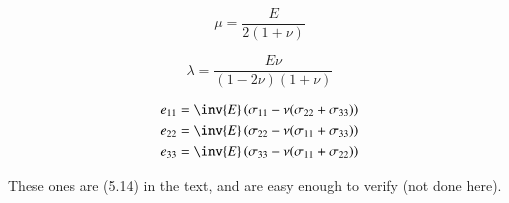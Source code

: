\begin{equation}\label{eqn:continuumL5:430}
\mu = \frac{E}{2(1 + \nu)}
\end{equation}

\begin{equation}\label{eqn:continuumL5:450}
\lambda = \frac{E \nu}{(1 - 2 \nu)(1 + \nu)}
\end{equation}

\begin{align}\label{eqn:continuumL5:470}
e_{11} &= \inv{E}\left( \sigma_{11} - \nu(\sigma_{22} + \sigma_{33}) \right) \\
e_{22} &= \inv{E}\left( \sigma_{22} - \nu(\sigma_{11} + \sigma_{33}) \right) \\
e_{33} &= \inv{E}\left( \sigma_{33} - \nu(\sigma_{11} + \sigma_{22}) \right)
\end{align}

These ones are (5.14) in the text, and are easy enough to verify (not done here).
